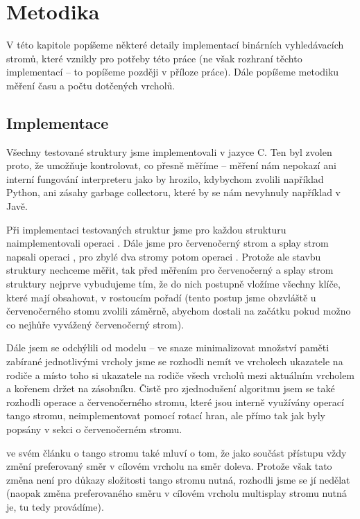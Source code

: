 \chapter{Metodika}

V této kapitole popíšeme některé detaily implementací binárních vyhledávacích stromů, které vznikly pro potřeby této práce (ne však rozhraní těchto implementací -- to popíšeme později v příloze práce). Dále popíšeme metodiku měření času a počtu dotčených vrcholů.

\section{Implementace}

Všechny testované struktury jsme implementovali v jazyce C. Ten byl zvolen proto, že umožňuje kontrolovat, co přesně měříme -- měření nám nepokazí ani interní fungování interpreteru jako by hrozilo, kdybychom zvolili například Python, ani zásahy garbage collectoru, které by se nám nevyhnuly například v Javě.

Při implementaci testovaných struktur jsme pro každou strukturu
naimplementovali operaci . Dále jsme pro červenočerný strom a splay
strom napsali operaci , pro zbylé dva stromy potom operaci
. Protože ale stavbu struktury nechceme měřit, tak před měřením pro
červenočerný a splay strom struktury nejprve vybudujeme tím, že do nich
postupně vložíme všechny klíče, které mají obsahovat, v rostoucím pořadí (tento postup jsme obzvláště u červenočerného stomu zvolili záměrně, abychom dostali na začátku pokud možno co nejhůře vyvážený červenočerný strom). 

Dále jsem se odchýlili od modelu -- ve snaze minimalizovat množství paměti zabírané jednotlivými vrcholy jsme se rozhodli nemít ve vrcholech ukazatele na rodiče a místo toho si ukazatele na rodiče všech vrcholů mezi aktuálním vrcholem a kořenem držet na zásobníku. Čistě pro zjednodušení algoritmu jsem se také rozhodli operace  a  červenočerného stromu, které jsou interně využívány operací  tango stromu, neimplementovat pomocí rotací hran, ale přímo tak jak byly popsány v sekci o červenočerném stromu. 

\citet{tango} ve svém článku o tango stromu také mluví o tom, že jako součást přístupu vždy změní preferovaný směr v cílovém vrcholu na směr doleva. Protože však tato změna není pro důkazy složitosti tango stromu nutná, rozhodli jsme se jí nedělat (naopak změna preferovaného směru v cílovém vrcholu multisplay stromu nutná je, tu tedy provádíme).

